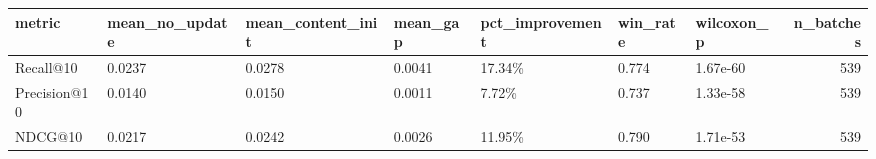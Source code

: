\begin{tabular}{lllllllr}
\toprule
metric & mean_no_update & mean_content_init & mean_gap & pct_improvement & win_rate & wilcoxon_p & n_batches \\
\midrule
Recall@10 & 0.0237 & 0.0278 & 0.0041 & 17.34\% & 0.774 & 1.67e-60 & 539 \\
Precision@10 & 0.0140 & 0.0150 & 0.0011 & 7.72\% & 0.737 & 1.33e-58 & 539 \\
NDCG@10 & 0.0217 & 0.0242 & 0.0026 & 11.95\% & 0.790 & 1.71e-53 & 539 \\
\bottomrule
\end{tabular}
